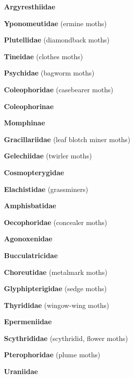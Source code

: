 \documentclass[letterpaper,10pt]{article}
\begin{document}
{\makebox[0.6cm]{}  \textbf{Argyresthiidae} \par
\makebox[0.6cm]{}  \textbf{Yponomeutidae} (ermine moths) \par
\makebox[0.6cm]{}  \textbf{Plutellidae} (diamondback moths) \par
\makebox[0.6cm]{}  \textbf{Tineidae} (clothes moths) \par
\makebox[0.6cm]{}  \textbf{Psychidae} (bagworm moths) \par
\makebox[0.6cm]{}  \textbf{Coleophoridae} (casebearer moths) \par
\makebox[0.8cm]{}  \textbf{Coleophorinae} \par
\makebox[0.8cm]{}  \textbf{Momphinae} \par
\makebox[0.6cm]{}  \textbf{Gracillariidae} (leaf blotch miner moths) \par
\makebox[0.6cm]{}  \textbf{Gelechiidae} (twirler moths) \par
\makebox[0.6cm]{}  \textbf{Cosmopterygidae} \par
\makebox[0.6cm]{}  \textbf{Elachistidae} (grassminers) \par
\makebox[0.6cm]{}  \textbf{Amphisbatidae} \par
\makebox[0.6cm]{}  \textbf{Oecophoridae} (concealer moths) \par
\makebox[0.6cm]{}  \textbf{Agonoxenidae} \par
\makebox[0.6cm]{}  \textbf{Bucculatricidae} \par
\makebox[0.6cm]{}  \textbf{Choreutidae} (metalmark moths) \par
\makebox[0.6cm]{}  \textbf{Glyphipterigidae} (sedge moths) \par
\makebox[0.6cm]{}  \textbf{Thyrididae} (wingow-wing moths) \par
\makebox[0.6cm]{}  \textbf{Epermeniidae} \par
\makebox[0.6cm]{}  \textbf{Scythrididae} (scythridid, flower moths) \par
\makebox[0.6cm]{}  \textbf{Pterophoridae} (plume moths) \par
\makebox[0.6cm]{}  \textbf{Uraniidae} \par
}
\end{document}
